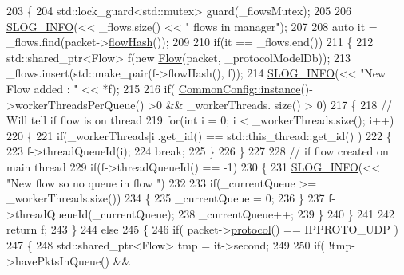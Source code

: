 \begin{DoxyCode}
203 \{
204     std::lock\_guard<std::mutex> guard(\_flowsMutex);
205 
206     \hyperlink{_logger_8h_a119c1c29ba35a8db38e2358e41167282}{SLOG\_INFO}(<< \_flows.size() << \textcolor{stringliteral}{" flows in manager"});
207 
208     \textcolor{keyword}{auto} it = \_flows.find(packet->\hyperlink{class_vsid_common_1_1_i_pv4_packet_a75fde96785c70c7a818a165482eae5e5}{flowHash}());
209 
210     \textcolor{keywordflow}{if}(it == \_flows.end())
211     \{
212         std::shared\_ptr<Flow>  f(\textcolor{keyword}{new} \hyperlink{class_vsid_common_1_1_flow}{Flow}(packet, \_protocolModelDb));
213         \_flows.insert(std::make\_pair(f->flowHash(), f));
214         \hyperlink{_logger_8h_a119c1c29ba35a8db38e2358e41167282}{SLOG\_INFO}(<< \textcolor{stringliteral}{"New Flow added : "} << *f);
215 
216         \textcolor{keywordflow}{if}( \hyperlink{class_vsid_common_1_1_common_config_a69c29458a786be527fe66470ac9fbbdb}{CommonConfig::instance}()->workerThreadsPerQueue() >0 && \_workerThreads.
      size() > 0)
217         \{
218             \textcolor{comment}{// Will tell if flow is on thread}
219             \textcolor{keywordflow}{for}(\textcolor{keywordtype}{int} i = 0; i < \_workerThreads.size(); i++)
220             \{
221                 \textcolor{keywordflow}{if}(\_workerThreads[i].get\_id() == std::this\_thread::get\_id() )
222                 \{
223                     f->threadQueueId(i);
224                     \textcolor{keywordflow}{break};
225                 \}
226             \}
227 
228             \textcolor{comment}{// if flow created on main thread}
229             \textcolor{keywordflow}{if}(f->threadQueueId() == -1)
230             \{
231                 \hyperlink{_logger_8h_a119c1c29ba35a8db38e2358e41167282}{SLOG\_INFO}(<< \textcolor{stringliteral}{"New flow so no queue in flow "})
232                 
233                 if(\_currentQueue >= \_workerThreads.size())
234                 \{
235                     \_currentQueue = 0;
236                 \}
237                 f->threadQueueId(\_currentQueue);
238                 \_currentQueue++;
239             \}
240         \}
241         
242         \textcolor{keywordflow}{return} f;
243     \}
244     \textcolor{keywordflow}{else}
245     \{
246         \textcolor{keywordflow}{if}( packet->\hyperlink{class_vsid_common_1_1_i_pv4_packet_ac1ff979633726d9f558bce1210595879}{protocol}() == IPPROTO\_UDP )
247         \{
248             std::shared\_ptr<Flow> tmp = it->second;
249             
250             \textcolor{keywordflow}{if}( !tmp->havePktsInQueue() &&

\end{DoxyCode}

